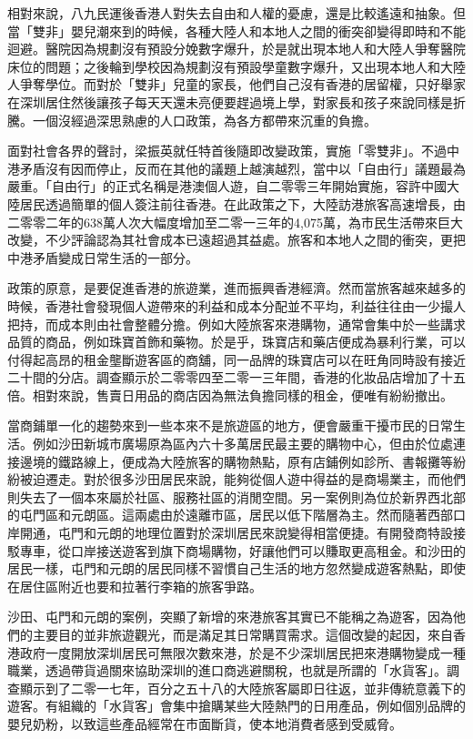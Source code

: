 相對來說，八九民運後香港人對失去自由和人權的憂慮，還是比較遙遠和抽象。但當「雙非」嬰兒潮來到的時候，各種大陸人和本地人之間的衝突卻變得即時和不能迴避。醫院因為規劃沒有預設分娩數字爆升，於是就出現本地人和大陸人爭奪醫院床位的問題；之後輪到學校因為規劃沒有預設學童數字爆升，又出現本地人和大陸人爭奪學位。而對於「雙非」兒童的家長，他們自己沒有香港的居留權，只好舉家在深圳居住然後讓孩子每天天還未亮便要趕過境上學，對家長和孩子來說同樣是折騰。一個沒經過深思熟慮的人口政策，為各方都帶來沉重的負擔。

面對社會各界的聲討，梁振英就任特首後隨即改變政策，實施「零雙非」。不過中港矛盾沒有因而停止，反而在其他的議題上越演越烈，當中以「自由行」議題最為嚴重。「自由行」的正式名稱是港澳個人遊，自二零零三年開始實施，容許中國大陸居民透過簡單的個人簽注前往香港。在此政策之下，大陸訪港旅客高速增長，由二零零二年的638萬人次大幅度增加至二零一三年的4,075萬，為市民生活帶來巨大改變，不少評論認為其社會成本已遠超過其益處。旅客和本地人之間的衝突，更把中港矛盾變成日常生活的一部分。

政策的原意，是要促進香港的旅遊業，進而振興香港經濟。然而當旅客越來越多的時候，香港社會發現個人遊帶來的利益和成本分配並不平均，利益往往由一少撮人把持，而成本則由社會整體分擔。例如大陸旅客來港購物，通常會集中於一些講求品質的商品，例如珠寶首飾和藥物。於是乎，珠寶店和藥店便成為暴利行業，可以付得起高昂的租金壟斷遊客區的商舖，同一品牌的珠寶店可以在旺角同時設有接近二十間的分店。調查顯示於二零零四至二零一三年間，香港的化妝品店增加了十五倍。相對來說，售賣日用品的商店因為無法負擔同樣的租金，便唯有紛紛撤出。

當商鋪單一化的趨勢來到一些本來不是旅遊區的地方，便會嚴重干擾市民的日常生活。例如沙田新城市廣場原為區內六十多萬居民最主要的購物中心，但由於位處連接邊境的鐵路線上，便成為大陸旅客的購物熱點，原有店鋪例如診所、書報攤等紛紛被迫遷走。對於很多沙田居民來說，能夠從個人遊中得益的是商場業主，而他們則失去了一個本來屬於社區、服務社區的消閒空間。另一案例則為位於新界西北部的屯門區和元朗區。這兩處由於遠離市區，居民以低下階層為主。然而隨著西部口岸開通，屯門和元朗的地理位置對於深圳居民來說變得相當便捷。有開發商特設接駁專車，從口岸接送遊客到旗下商場購物，好讓他們可以賺取更高租金。和沙田的居民一樣，屯門和元朗的居民同樣不習慣自己生活的地方忽然變成遊客熱點，即使在居住區附近也要和拉著行李箱的旅客爭路。

沙田、屯門和元朗的案例，突顯了新增的來港旅客其實已不能稱之為遊客，因為他們的主要目的並非旅遊觀光，而是滿足其日常購買需求。這個改變的起因，來自香港政府一度開放深圳居民可無限次數來港，於是不少深圳居民把來港購物變成一種職業，透過帶貨過關來協助深圳的進口商逃避關稅，也就是所謂的「水貨客」。調查顯示到了二零一七年，百分之五十八的大陸旅客屬即日往返，並非傳統意義下的遊客。有組織的「水貨客」會集中搶購某些大陸熱門的日用產品，例如個別品牌的嬰兒奶粉，以致這些產品經常在市面斷貨，使本地消費者感到受威脅。

